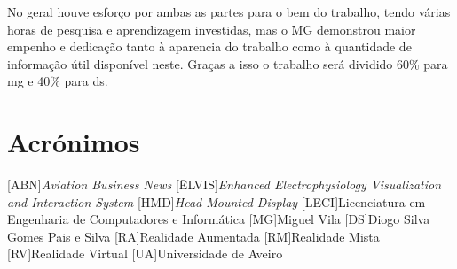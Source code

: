 \documentclass{report}
\begin{document}
No geral houve esforço por ambas as partes para o bem do trabalho, tendo várias horas de pesquisa e aprendizagem investidas, mas o MG demonstrou maior empenho e dedicação tanto à aparencia do trabalho como à quantidade de informação útil disponível neste. Graças a isso o trabalho será dividido 60\% para \ac{mg} e 40\% para \ac{ds}.



\chapter*{Acrónimos}
\begin{acronym}
[ABN]{\textit{Aviation Business News}}
[ĒLVIS]{\textit{Enhanced Electrophysiology Visualization and Interaction System}}
[HMD]{\textit{Head-Mounted-Display}}
[LECI]{Licenciatura em Engenharia de Computadores e Informática}
[MG]{Miguel Vila}
[DS]{Diogo Silva Gomes Pais e Silva}
[RA]{Realidade Aumentada}
[RM]{Realidade Mista}
[RV]{Realidade Virtual}
[UA]{Universidade de Aveiro}
\end{acronym}

\printbibliography
\end{document}
